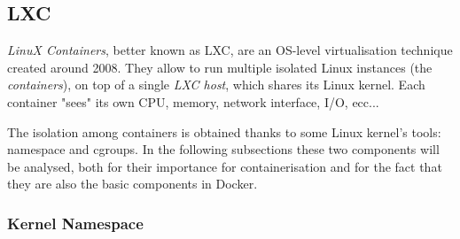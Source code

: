 \documentclass[a4paper,12pt]{article}
\begin{document}

\subsection{LXC}

\textit{LinuX Containers}, better known as LXC, are an OS-level virtualisation
technique created around 2008. They allow to run multiple isolated Linux
instances (the \textit{containers}), on top of a single \textit{LXC host}, which
shares its Linux kernel\cite{wikipedia_LXC}. Each container "sees" its own CPU,
memory, network interface, I/O, ecc... \par The isolation among containers is
obtained thanks to some Linux kernel's tools: namespace and cgroups. In the
following subsections these two components will be analysed, both for their
importance for containerisation and for the fact that they are also the basic
components in Docker.

\subsubsection{Kernel Namespace}
\end{document}
